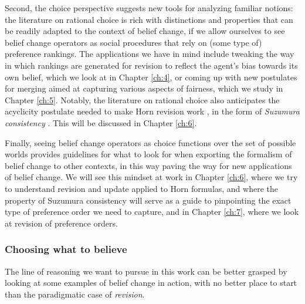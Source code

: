 Second, the choice perspective suggests 
new tools for analyzing familiar notions:
the literature on rational choice is rich 
with distinctions and properties 
that can be readily adapted to the 
context of belief change, if we allow ourselves 
to see belief change operators as social procedures 
that rely on (some type of) preference rankings.
The applications we have in mind include tweaking 
the way in which rankings are generated for revision
to reflect the agent's bias towards its own belief,
which we look at in Chapter \ref{ch:4},
or coming up with new postulates for merging 
aimed at capturing various aspects of fairness, 
which we study in Chapter \ref{ch:5}.
Notably, the literature on rational choice also anticipates 
the acyclicity postulate needed to make Horn 
revision work \cite{DelgrandeP15,DelgrandePW18},
in the form of \emph{Suzumura consistency} \cite{Suzumura76,Suzumura83,BossertS10}.
This will be discussed in Chapter \ref{ch:6}.

Finally, seeing belief change operators as choice functions 
over the set of possible worlds
provides guidelines for what to look for when exporting 
the formalism of belief change to other contexts,
in this way paving the way for new applications of belief change.
We will see this mindset at work in Chapter \ref{ch:6},
where we try to understand revision and update applied to Horn formulas,
and where the property of Suzumura consistency will serve as 
a guide to pinpointing the exact type of preference order 
we need to capture,
and in Chapter \ref{ch:7}, where we look at revision of preference orders.

\subsubsection{Choosing what to believe}
The line of reasoning we want to 
pursue in this work can be better grasped 
by looking at some examples
of belief change in action,
with no better place to start 
than the paradigmatic case of \emph{revision}.

